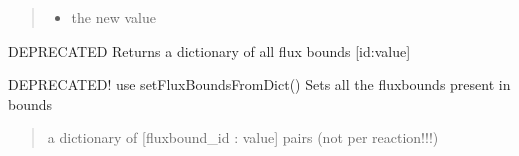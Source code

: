 \documentclass[letterpaper,12pt,english]{sphinxmanual}
\begin{document}
\begin{fulllineitems}
\begin{fulllineitems}
\begin{quote}
\begin{description}
\begin{itemize}
\item {} 
\sphinxAtStartPar
{} \textendash{} the new value

\end{itemize}

\end{description}\end{quote}

\end{fulllineitems}


\begin{fulllineitems}
\label{\detokenize{api/core:cbmpy.CBModel.Model.getAllFluxBounds}}
\pysigstartsignatures
\pysiglinewithargsret
{}
{}
{}
\pysigstopsignatures
\sphinxAtStartPar
DEPRECATED Returns a dictionary of all flux bounds {[}id:value{]}

\end{fulllineitems}


\begin{fulllineitems}
\label{\detokenize{api/core:cbmpy.CBModel.Model.setAllFluxBounds}}
\pysigstartsignatures
\pysiglinewithargsret
{}
{}
{}
\pysigstopsignatures
\sphinxAtStartPar
DEPRECATED! use setFluxBoundsFromDict() Sets all the fluxbounds present in bounds
\begin{quote}\begin{description}
\sphinxAtStartPar
{} \textendash{} a dictionary of {[}fluxbound\_id : value{]} pairs (not per reaction!!!)

\end{description}\end{quote}

\end{fulllineitems}



\end{fulllineitems}
\end{document}
